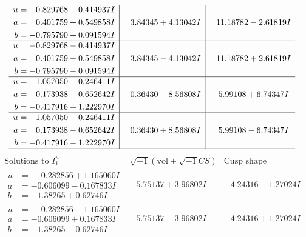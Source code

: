 \documentclass[1p]{elsarticle_modified}
\theoremstyle{definition}
\newcommand{\I}{\sqrt{-1}}
\begin{document}
$$\begin{array}{c|c|c}
\begin{aligned}
u &= -0.829768 + 0.414937 I \\
a &= \phantom{-}0.401759 + 0.549858 I \\
b &= -0.795790 + 0.091594 I\end{aligned}
 & \phantom{-}3.84345 + 4.13042 I & \phantom{-}11.18782 - 2.61819 I \\ \hline\begin{aligned}
u &= -0.829768 - 0.414937 I \\
a &= \phantom{-}0.401759 - 0.549858 I \\
b &= -0.795790 - 0.091594 I\end{aligned}
 & \phantom{-}3.84345 - 4.13042 I & \phantom{-}11.18782 + 2.61819 I \\ \hline\begin{aligned}
u &= \phantom{-}1.057050 + 0.246411 I \\
a &= \phantom{-}0.173938 + 0.652642 I \\
b &= -0.417916 + 1.222970 I\end{aligned}
 & \phantom{-}0.36430 - 8.56808 I & \phantom{-}5.99108 + 6.74347 I \\ \hline\begin{aligned}
u &= \phantom{-}1.057050 - 0.246411 I \\
a &= \phantom{-}0.173938 - 0.652642 I \\
b &= -0.417916 - 1.222970 I\end{aligned}
 & \phantom{-}0.36430 + 8.56808 I & \phantom{-}5.99108 - 6.74347 I\\
 \hline 
 \end{array}$$\newpage$$\begin{array}{c|c|c}  
\text{Solutions to }I^u_{1}& \I (\text{vol} + \sqrt{-1}CS) & \text{Cusp shape}\\
 \hline 
\begin{aligned}
u &= \phantom{-}0.282856 + 1.165060 I \\
a &= -0.606099 - 0.167833 I \\
b &= -1.38265 + 0.62746 I\end{aligned}
 & -5.75137 + 3.96802 I & -4.24316 - 1.27024 I \\ \hline\begin{aligned}
u &= \phantom{-}0.282856 - 1.165060 I \\
a &= -0.606099 + 0.167833 I \\
b &= -1.38265 - 0.62746 I\end{aligned}
 & -5.75137 - 3.96802 I & -4.24316 + 1.27024 I \\ \hline\begin{aligned}

\end{aligned}
\end{array}$$
\end{document}
